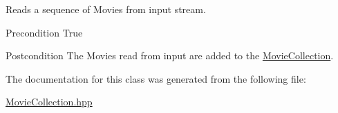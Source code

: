 Reads a sequence of Movies from input stream. 

\begin{DoxyPrecond}{Precondition}
True 
\end{DoxyPrecond}
\begin{DoxyPostcond}{Postcondition}
The Movies read from input are added to the \hyperlink{class_movie_collection}{MovieCollection}. 
\end{DoxyPostcond}


The documentation for this class was generated from the following file:\begin{DoxyCompactItemize}
\item 
\hyperlink{_movie_collection_8hpp}{MovieCollection.hpp}\end{DoxyCompactItemize}
